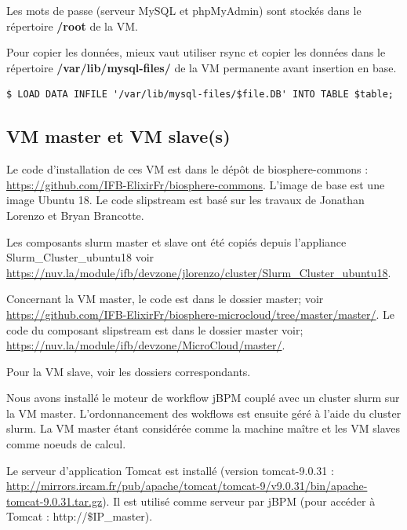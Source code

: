Les mots de passe (serveur MySQL et phpMyAdmin) sont stockés dans le répertoire \textbf{/root} de la VM.
\newline 

Pour copier les données, mieux vaut utiliser rsync et copier les données dans le répertoire \textbf{/var/lib/mysql-files/} de la VM permanente avant insertion en base.

\begin{lstlisting}[style=bash]
$ LOAD DATA INFILE '/var/lib/mysql-files/$file.DB' INTO TABLE $table;
\end{lstlisting}

\subsection{VM master et VM slave(s)} \label{master&slave}


Le code d’installation de ces VM est dans le dépôt de biosphere-commons : \url{https://github.com/IFB-ElixirFr/biosphere-commons}.
L'image de base est une image Ubuntu 18. Le code slipstream est basé sur les travaux de Jonathan Lorenzo et Bryan Brancotte. 

Les composants slurm master et slave ont été copiés depuis l'appliance Slurm\_Cluster\_ubuntu18 voir \url{https://nuv.la/module/ifb/devzone/jlorenzo/cluster/Slurm_Cluster_ubuntu18}.

Concernant la VM master, le code est dans le dossier master; voir
\url{https://github.com/IFB-ElixirFr/biosphere-microcloud/tree/master/master/}.
Le code du composant slipstream est dans le dossier master voir; \url{https://nuv.la/module/ifb/devzone/MicroCloud/master/}.

Pour la VM slave, voir les dossiers correspondants.\newline

Nous avons installé le moteur de workflow jBPM couplé avec un cluster slurm sur la VM master. L'ordonnancement des wokflows est ensuite géré à l'aide du cluster slurm. La VM master étant considérée comme la machine maître et les VM slaves comme noeuds de calcul.
\bigskip

Le serveur d'application Tomcat est installé (version tomcat-9.0.31 : \url{http://mirrors.ircam.fr/pub/apache/tomcat/tomcat-9/v9.0.31/bin/apache-tomcat-9.0.31.tar.gz}).
Il est utilisé comme serveur par jBPM (pour accéder à Tomcat : http://\$IP\_master).
\bigskip

